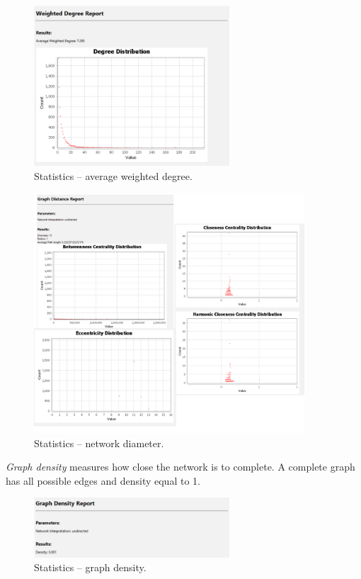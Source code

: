 \documentclass[12pt, a4paper]{article}
\begin{document}
\begin{figure}[!h]
\centering
\includegraphics[width=0.65\textwidth]{s6p2.png}
\caption{Statistics -- average weighted degree.}
\end{figure}

\begin{figure}[!h]
\centering
\includegraphics[width=0.9\textwidth]{s6p3.png}
\caption{Statistics -- network diameter.}
\end{figure}

\newpage

\textit{Graph density} measures how close the network is to complete. A complete graph has all possible edges and density equal to 1.
\begin{figure}[!h]
\centering
\includegraphics[width=0.65\textwidth]{s6p4.png}
\caption{Statistics -- graph density.}
\end{figure}
\end{document}
